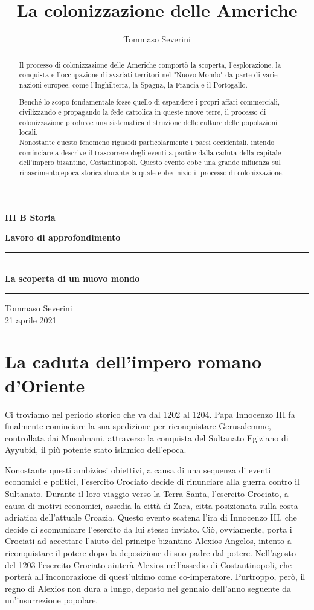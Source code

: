 \documentclass[11pt]{report}
\title{La colonizzazione delle Americhe}
\author{Tommaso Severini}
\begin{document}
	
	
	\begin{titlepage}
		\begin{center}
			\Large\textbf{ III B Storia}
			
			\Large\textbf{Lavoro di approfondimento}
			\vfill
			\rule{400pt}{0.1pt}\\
			
			\huge\textbf{La scoperta di un nuovo mondo}
			\rule{400pt}{0.1pt}
			\vfill
			{\small Tommaso Severini\\
			21 aprile 2021}
		\end{center}
	\end{titlepage}	
	
	\begin{abstract}
		Il processo di colonizzazione delle Americhe comportò la scoperta, l'esplorazione, la conquista e l'occupazione di svariati territori nel "Nuovo Mondo" da parte di varie nazioni europee, come l'Inghilterra, la Spagna, la Francia e il Portogallo. 
		
		Benché lo scopo fondamentale fosse quello di espandere i propri affari commerciali, civilizzando e propagando la fede cattolica in queste nuove terre, il processo di colonizzazione produsse una sistematica distruzione delle culture delle popolazioni locali.\\
		
		Nonostante questo fenomeno riguardi particolarmente i paesi occidentali, intendo cominciare a descrive il trascorrere degli eventi a partire dalla caduta della capitale dell'impero bizantino, Costantinopoli. Questo evento ebbe una grande influenza sul rinascimento,epoca storica durante la quale ebbe inizio il processo di colonizzazione.
	\end{abstract}
	
	\chapter{La caduta dell'impero romano d'Oriente}
	
	Ci troviamo nel periodo storico che va dal 1202 al 1204. Papa Innocenzo III fa finalmente cominciare la sua spedizione per riconquistare Gerusalemme, controllata dai Musulmani, attraverso la conquista del Sultanato Egiziano di Ayyubid, il più potente stato islamico dell'epoca. 
	
	Nonostante questi ambiziosi obiettivi, a causa di una sequenza di eventi economici e politici, l'esercito Crociato decide di rinunciare alla guerra contro il Sultanato. Durante il loro viaggio verso la Terra Santa, l'esercito Crociato, a causa di motivi economici, assedia la città di Zara, citta posizionata sulla costa adriatica dell'attuale Croazia. Questo evento scatena l'ira di Innocenzo III, che decide di scomunicare l'esercito da lui stesso inviato. Ciò, ovviamente, porta i Crociati ad accettare l'aiuto del principe bizantino Alexios Angelos, intento a riconquistare il potere dopo la deposizione di suo padre dal potere. Nell'agosto del 1203 l'esercito Crociato aiuterà Alexios nell'assedio di Costantinopoli, che porterà all'inconorazione di quest'ultimo come co-imperatore. Purtroppo, però, il regno di Alexios non dura a lungo, deposto nel gennaio dell'anno seguente da un'insurrezione popolare. 
	
\end{document}
